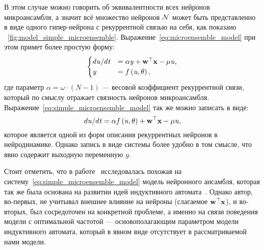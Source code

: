 В этом случае можно говорить об эквивалентности всех нейронов микроансамбля, а значит всё множество нейронов $\mathcal{N}$ может быть представленно в виде одного гипер-нейрона с рекуррентной связью на себя, как показано \onfigure~\ref{fig:model_simple_microensemble}. Выражение~\eqref{eq:microensemble_model} при этом примет более простую форму:
\begin{equation}
    \label{eq:simple_microensemble_model}
    \begin{cases}
    d\mathit{u}/d\mathit{t} &= \alpha \mathit{y} + \mathrm{\mathbf{w}}^{\top} \mathrm{\mathbf{x}} - \mu \mathit{u}, \\
    \mathit{y}              &= f\left( \mathit{u}, \theta \right), \\
    \end{cases}
\end{equation}
где параметр $\alpha = \omega \cdot \left( N - 1 \right)$ --- весовой коэффициент рекуррентной связи, который по смыслу отражает связность нейронов микроансамбля. Выражение~\eqref{eq:simple_microensemble_model} так же можно записать в виде:
\begin{equation}
    \nonumber
    d\mathit{u}/d\mathit{t} = \alpha f\left( \mathit{u}, \theta \right) + \mathrm{\mathbf{w}}^{\top} \mathrm{\mathbf{x}} - \mu \mathit{u},
\end{equation}
которое является одной из форм описания рекуррентных нейронов в нейродинамике. Однако запись в виде системы более удобно в том смысле, что явно содержит выходную переменную $y$.


Стоит отметить, что в работе~\cite{Pchelkin2003} исследовалась похожая на систему~\eqref{eq:simple_microensemble_model} модель нейронного ансамбля, которая так же была основана на развитии идей индуктивного автомата~\cite{EmelyanovYaroslavsky1990}. Однако автор, во-первых, не учитывал внешнее влияние на нейроны (слагаемое $\mathrm{\mathbf{w}}^{\top} \mathrm{\mathbf{x}}$), и во-вторых, был сосредоточен на конкретной проблеме, а именно на связи поведения модели с \socalled оптимальной частотой --- основополагающим параметром модели индуктивного автомата, который в явном виде отсутствует в рассматриваемой нами модели.


